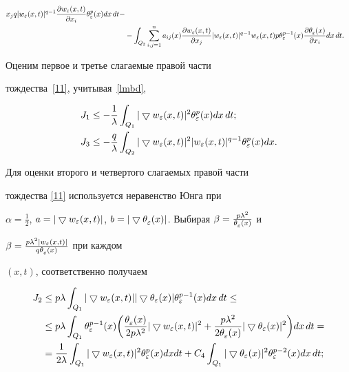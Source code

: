 \begin{pf}
\begin{align}
{x_j}q|w_\eps(x,t)|^{q-1}\frac {\dd w_\eps(x,t)}{\dd x_i}\tmp dx\,dt - \notag\\


\label{11}


&-\int_{Q_2}\stdsum a_{ij}(x) \frac {\dd w_\eps(x,t)}{\dd


x_j}|w_\eps(x,t)|^{q-1}w_\eps(x,t)p\tmd{p-1}\frac{\dd \tm}{\dd


x_i} dx\,dt. 


\end{align}


Оценим первое и третье слагаемые правой части


тождества~\eqref{11}, учитывая~\eqref{lmbd},


\begin{align}


J_1&\le -\frac{1}{\lambda}\int_{Q_1}\mgrad^2\tmp dx\,dt; \label{12} \\


%


J_3 &\le -\frac{q}{\lambda}\int_{Q_2}\mgrad^2


|w_\eps(x,t)|^{q-1}\tmp dx. \label{13}


\end{align}


Для оценки второго и четвертого слагаемых правой части


тождества \eqref{11} используется неравенство Юнга при


$\alpha=\frac{1}{2}$, $a=\mgrad$, $b=|\grad


\tm|$. Выбирая $\beta=\frac{p\lambda^2}{\tm}$ и


$\beta=\frac{p\lambda^2|w_\varepsilon(x,t)|}{q\theta_\varepsilon^{}(x)}$ при каждом


$(x,t)$, соответственно получаем


\begin{align}


J_2 &\le p\lambda \int_{Q_1} \mgrad \tgrad \tmd{p-1} dx\,dt\le \notag\\


%


& \le p\lambda \int_{Q_1} \tmd{p-1}


\bigg(\frac{\tm}{2p\lambda^2}\mgrad^2


+\frac{p\lambda^2}{2\tm}\tgrad^2 \bigg) dx\,dt= \notag\\


&=\frac{1}{2\lambda} \int_{Q_1} \mgrad^2\tmp dxdt +C_4


\int_{Q_1} \tgrad^2 \tmd{p-2} dx\,dt; \label{14} \\



\end{align}
\end{pf}
